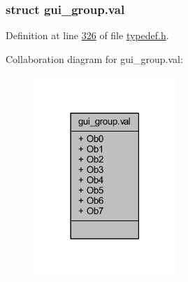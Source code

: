 \subsubsection{struct gui\+\_\+group.\+val}


Definition at line \hyperlink{a00001_source_l00326}{326} of file \hyperlink{a00001_source}{typedef.\+h}.



Collaboration diagram for gui\+\_\+group.\+val\+:
\nopagebreak
\begin{figure}[H]
\begin{center}
\leavevmode
\includegraphics[width=153pt]{d3/dcc/a00264}
\end{center}
\end{figure}
